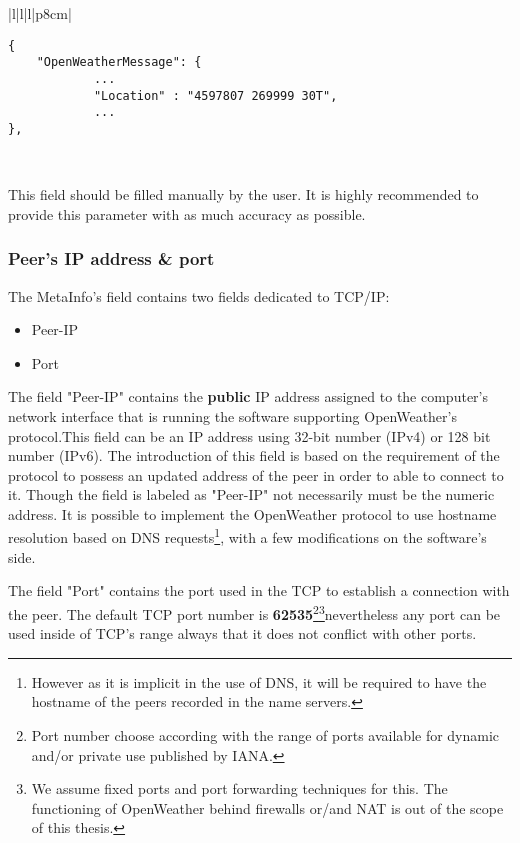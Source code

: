 \begin{table}[H]
\centering
\begin{tabular}{|l|l|l|p{8cm}|}
\hline
\begin{minipage}[t]{\linewidth}
	\begin{verbatim}
{
    "OpenWeatherMessage": {
            ...
            "Location" : "4597807 269999 30T",
            ...
},
      \end{verbatim}
\end{minipage} \\
\hline
\end{tabular}
\caption{Location field in a data messages of OpenWeather protocol.}
\end{table}

This field should be filled manually by the user. It is highly recommended to provide this parameter with as much accuracy as possible.

\subsubsection{Peer's IP address \& port}

The MetaInfo's field contains two fields dedicated to \gls{TCP}/\gls{IP}:
\begin{itemize}
\item Peer-IP
\item Port
\end{itemize}

The field "Peer-IP" contains the \textbf{public} \gls{IP} address assigned to the computer's network interface that is running the software supporting OpenWeather's protocol.This field can be an \gls{IP} address using 32-bit number (\gls{IP}v4) or 128 bit number (\gls{IP}v6). The introduction of this field is based on the requirement of the protocol to possess an updated address of the peer in order to able to connect to it. Though the field is labeled as "Peer-IP" not necessarily must be the numeric address. It is possible to implement the OpenWeather protocol to use hostname resolution based on \gls{DNS} requests\footnote{However as it is implicit in the use of \gls{DNS}, it will be required to have the hostname of the peers recorded in the name servers.}, with a few modifications on the software's side.

The field "Port" contains the port used in the \gls{TCP} to establish a connection with the peer. The default \gls{TCP} port number is \textbf{62535}\footnote{Port number choose according with the range of ports available for dynamic and/or private use published by IANA\cite{IANA}.}\footnote{We assume fixed ports and port forwarding techniques for this. The functioning of OpenWeather behind firewalls or/and \gls{NAT} is out of the scope of this thesis.}nevertheless any port can be used inside of \gls{TCP}'s range always that it does not conflict with other ports.

